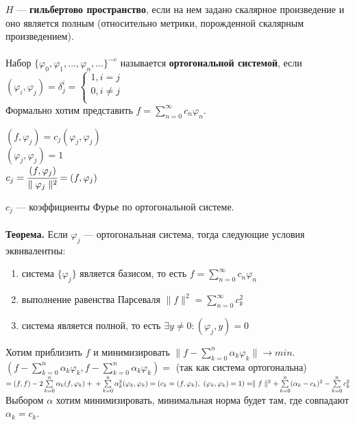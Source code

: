 \documentclass[12pt]{article}
\theoremstyle{definition}
\numberwithin{equation}{section}
\begin{document}
$H$ --- \textbf{гильбертово пространство}, если на нем задано скалярное произведение и оно является полным (относительно метрики, порожденной скалярным произведением).\\
\\
Набор $\{ \varphi_0, \varphi_1,...,\varphi_n,...\}^{-e}$ называется \textbf{ортогональной системой}, если \\$(\varphi_i, \varphi_j) = \delta_j^i = 
\left\{  
\begin{array}{lcl}  
    1, i = j \\  
    0, i \neq j \\
\end{array}   
\right.  
$\\
Формально хотим представить $f = \sum\limits_{n=0}^{\infty} c_n \varphi_n$.\begin{center}
$(f, \varphi_j) = c_j(\varphi_j, \varphi_j)$\\ 
$(\varphi_j, \varphi_j) = 1$\\ 
$c_j = \cfrac{(f, \varphi_j)}{\parallel \varphi_j \parallel^2} = (f, \varphi_j)$\end{center} $c_j$ --- коэффициенты Фурье по ортогональной системе.\\ \\
\textbf{Теорема.}
Если $\varphi_j$ --- ортогональная система, тогда следующие условия эквивалентны:\begin{enumerate}
\item система $\{\varphi_j\}$ является базисом, то есть $f = \sum\limits_{n=0}^{\infty}c_n \varphi_n$
\item выполнение равенства Парсеваля $\parallel f \parallel^2 = \sum\limits_{n=0}^{\infty}c_k^2$
\item система является полной, то есть $\exists y \neq 0: (\varphi_j, y) = 0$
\end{enumerate}
Хотим приблизить $f$ и минимизировать $\parallel f - \sum\limits_{k=0}^n \alpha_k \varphi_k \parallel \to min$.\\
$(f - \sum\limits_{k=0}^n \alpha_k \varphi_k, f - \sum\limits_{k=0}^n \alpha_k \varphi_k) =$ (так как система ортогональна) $= (f, f) - 2\sum\limits_{k=0}^n \alpha_k (f, \varphi_k) +\\+\sum\limits_{k=0}^n \alpha_k^2 (\varphi_k, \varphi_k) = (c_k=(f, \varphi_k),~ (\varphi_k, \varphi_k)=1) = \parallel f \parallel^2 + \sum\limits_{k=0}^n (\alpha_k - c_k)^2 - \sum\limits_{k=0}^n c_k^2$\\
Выбором $\alpha$ хотим минимизировать, минимальная норма будет там, где совпадают $\alpha_k = c_k$.\\
\end{document}
